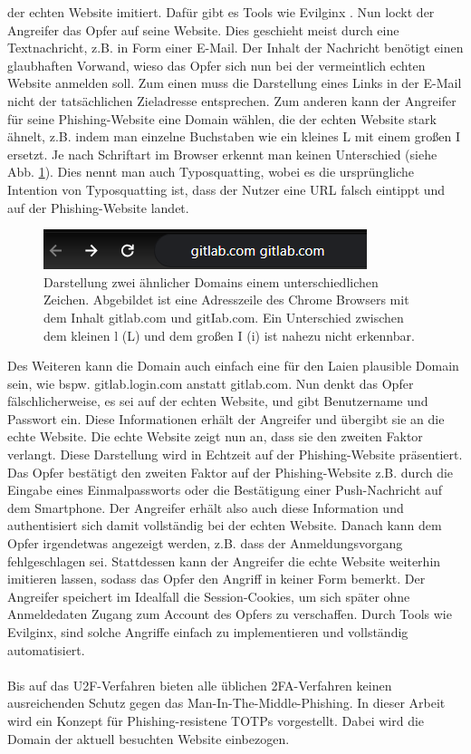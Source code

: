 der echten Website imitiert. Dafür gibt es Tools wie Evilginx \autocite{evilginx}. Nun lockt 
der Angreifer das Opfer auf seine Website. Dies geschieht meist durch eine 
Textnachricht, z.B. in Form einer E-Mail. Der Inhalt der Nachricht benötigt einen 
glaubhaften Vorwand, wieso das Opfer sich nun bei der vermeintlich echten Website 
anmelden soll. Zum einen muss die Darstellung eines Links in der E-Mail nicht der 
tatsächlichen Zieladresse entsprechen. Zum anderen kann der Angreifer für seine 
Phishing-Website eine Domain wählen, die der echten Website stark ähnelt, z.B. indem 
man einzelne Buchstaben wie ein kleines \glqq L\grqq{} mit einem großen \glqq I\grqq{} ersetzt. Je nach 
Schriftart im Browser erkennt man keinen Unterschied (siehe Abb. \ref{fig: gitlab}). Dies nennt man auch Typosquatting, wobei es die ursprüngliche Intention von Typosquatting ist, dass der Nutzer eine URL falsch eintippt und auf der Phishing-Website landet. 

\begin{figure}
    \centering
    \includegraphics[width=.5\linewidth]{figures/gitlab.png}
    \caption[Darstellung zwei ähnlicher Domains]{Darstellung zwei ähnlicher Domains einem unterschiedlichen Zeichen. Abgebildet ist eine Adresszeile des Chrome Browsers mit dem Inhalt \glqq gitlab.com\grqq{} und \glqq gitIab.com\grqq. Ein Unterschied zwischen dem kleinen \glqq l\grqq{} (L) und dem großen \glqq I\grqq{} (i) ist nahezu nicht erkennbar.}
    \label{fig: gitlab}
\end{figure}

Des Weiteren kann die Domain auch einfach eine für den Laien plausible Domain sein, 
wie bspw. \glqq gitlab.login.com\grqq{} anstatt \glqq gitlab.com\grqq{}. Nun denkt das Opfer 
fälschlicherweise, es sei auf der echten Website, und gibt Benutzername und Passwort 
ein. Diese Informationen erhält der Angreifer und übergibt sie an die echte Website. 
Die echte Website zeigt nun an, dass sie den zweiten Faktor verlangt. Diese 
Darstellung wird in Echtzeit auf der Phishing-Website präsentiert. Das Opfer 
bestätigt den zweiten Faktor auf der Phishing-Website z.B. durch die Eingabe eines 
Einmalpassworts oder die Bestätigung einer Push-Nachricht auf dem Smartphone. Der 
Angreifer erhält also auch diese Information und authentisiert sich damit 
vollständig bei der echten Website. Danach kann dem Opfer irgendetwas angezeigt 
werden, z.B. dass der Anmeldungsvorgang fehlgeschlagen sei. Stattdessen kann der Angreifer die echte Website weiterhin imitieren lassen, sodass das Opfer den Angriff in keiner Form bemerkt. 
Der Angreifer speichert im Idealfall die Session-Cookies, um sich später 
ohne Anmeldedaten Zugang zum Account des Opfers zu verschaffen. Durch Tools wie 
Evilginx, sind solche Angriffe einfach zu implementieren und vollständig 
automatisiert. \autocite{Srinivasan}
\\\\
Bis auf das U2F-Verfahren bieten alle üblichen 2FA-Verfahren keinen ausreichenden 
Schutz gegen das Man-In-The-Middle-Phishing. In dieser Arbeit wird ein Konzept für 
Phishing-resistene TOTPs vorgestellt. Dabei wird die Domain der aktuell besuchten 
Website einbezogen.